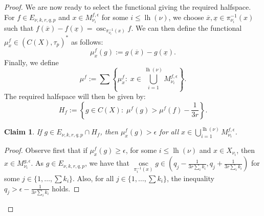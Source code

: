 \documentclass[11pt]{article}
\DeclareMathOperator{\osc}{osc}
\DeclareMathOperator{\lgth}{lh}
\newtheorem{claim}[theorem]{Claim}
\theoremstyle{definition}
\theoremstyle{remark}
\begin{document}
\begin{proof}
	We are now ready to select the functional giving the required halfspace. For $f \in E_{\nu,k,r,q,p}$ and $x \in M^{f, \epsilon}_{\nu_i}$ for some $i \leq \lgth(\nu)$, we choose $\overline{x}, \underline{x} \in \pi_{\nu_i}^{-1} (x)$ such that $f(\overline{x}) - f(\underline{x}) = \osc_{\pi_{\nu_i}^{-1}(x)} f$. We can then define the functional $\mu^f_x \in \left(C(X), \tau_p\right)^*$ as follows:
	\begin{equation*}
		\mu^f_x(g) := g(\overline{x}) - g(\underline{x}).
	\end{equation*}
	Finally, we define
	\begin{equation*}
		\mu^f := \sum \left\{\mu^f_x : \; x \in \bigcup\limits_{i = 1}^{\lgth(\nu)} M^{f, \epsilon}_{\nu_i} \right\}.
	\end{equation*}
	The required halfspace will then be given by:
	\begin{equation}
		H_f := \left\{g \in C(X): \; \mu^f (g) > \mu^f (f) - \frac{1}{3r}\right\}.
	\end{equation}
	
	\begin{claim}
		If $g \in E_{\nu,k,r,q,p} \cap H_f$, then $\mu^f_x(g) > \epsilon$ for all $x \in \bigcup_{i = 1}^{\lgth(\nu)} M^{f, \epsilon}_{\nu_i} $.
	\end{claim}
	
	\begin{proof}
		Observe first that if $\mu^f_x (g) \geq \epsilon$, for some $i \leq \lgth(\nu)$ and $x \in X_{\nu_i}$, then $x \in M^{g,\epsilon}_{\nu_i}$. As $g \in E_{\nu,k,r,q,p}$, we have that $\osc\limits_{\pi_i^{-1}(x)} g \in \left(q_j - \frac{1}{3 r \sum_i k_i}, q_j + \frac{1}{3 r \sum_i k_i}\right)$ for some $j \in \{1, \dots, \sum k_i\}$. Also, for all $j \in \{1, \dots, \sum k_i\}$, the inequality $q_j > \epsilon  - \frac{1}{3 r \sum_i k_i}$ holds.
		

\end{proof}
\end{proof}
\end{document}
